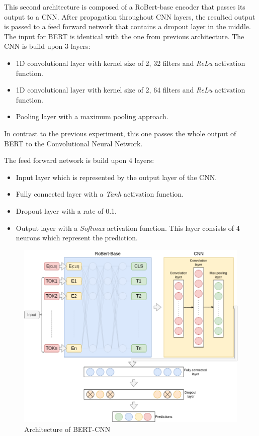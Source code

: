 \documentclass[12pt,a4paper]{report}
\begin{document}
This second architecture is composed of a RoBert-base encoder that passes its output to a CNN. After propagation throughout CNN layers, the resulted output is passed to a feed forward network that contains a dropout layer in the middle.
The input for BERT is identical with the one from previous architecture.
The CNN is build upon 3 layers:
\begin{itemize}
    \item 1D convolutional layer with kernel size of 2, 32 filters and \textit{ReLu} activation function.
    \item 1D convolutional layer with kernel size of 2, 64 filters and \textit{ReLu} activation function.
    \item Pooling layer with a maximum pooling approach.
\end{itemize}

In contrast to the previous experiment, this one passes the whole output of BERT to the Convolutional Neural Network.

The feed forward network is build upon 4 layers:
\begin{itemize}
    \item Input layer which is represented by the output layer of the CNN.
    \item Fully connected layer with a \textit{Tanh} activation function.
    \item Dropout layer with a rate of 0.1.
    \item Output layer with a \textit{Softmax} activation function. This layer consists of 4 neurons which represent the prediction.
\end{itemize}

\begin{figure}[H]
\centering
\includegraphics[width=16cm]{pics/BERT-CNN.png}
  \caption{Architecture of BERT-CNN}
  \label{fig:BERT-CNN}
\end{figure}
\end{document}
